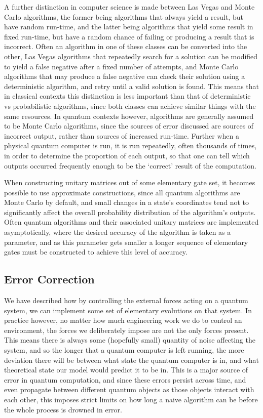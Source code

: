 A further distinction in computer science is made between Las Vegas and Monte Carlo algorithms, the former being algorithms that always yield a result, but have random run-time, and the latter being algorithms that yield some result in fixed run-time, but have a random chance of failing or producing a result that is incorrect. Often an algorithm in one of these classes can be converted into the other, Las Vegas algorithms that repeatedly search for a solution can be modified to yield a false negative after a fixed number of attempts, and Monte Carlo algorithms that may produce a false negative can check their solution using a deterministic algorithm, and retry until a valid solution is found. This means that in classical contexts this distinction is less important than that of deterministic vs probabilistic algorithms, since both classes can achieve similar things with the same resources. In quantum contexts however, algorithms are generally assumed to be Monte Carlo algorithms, since the sources of error discussed are sources of incorrect output, rather than sources of increased run-time. Further when a physical quantum computer is run, it is run repeatedly, often thousands of times, in order to determine the proportion of each output, so that one can tell which outputs occurred frequently enough to be the `correct' result of the computation.

When constructing unitary matrices out of some elementary gate set, it becomes possible to use approximate constructions, since all quantum algorithms are Monte Carlo by default, and small changes in a state's coordinates tend not to significantly affect the overall probability distribution of the algorithm's outputs. Often quantum algorithms and their associated unitary matrices are implemented asymptotically, where the desired accuracy of the algorithm is taken as a parameter, and as this parameter gets smaller a longer sequence of elementary gates must be constructed to achieve this level of accuracy.

\subsection{Error Correction}\label{error-codes}
We have described how by controlling the external forces acting on a quantum system, we can implement some set of elementary evolutions on that system. In practice however, no matter how much engineering work we do to control an environment, the forces we deliberately impose are not the only forces present. This means there is always some (hopefully small) quantity of noise affecting the system, and so the longer that a quantum computer is left running, the more deviation there will be between what state the quantum computer is in, and what theoretical state our model would predict it to be in. This is a major source of error in quantum computation, and since these errors persist across time, and even propagate between different quantum objects as those objects interact with each other, this imposes strict limits on how long a naive algorithm can be before the whole process is drowned in error.

